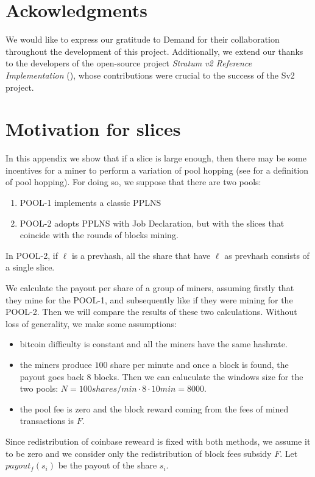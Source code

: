 \documentclass[11pt]{article}
\begin{document}
\section{Ackowledgments}
We would like to express our gratitude to Demand \cite{demand} for their collaboration throughout the development of this project. Additionally, we extend our thanks to the developers of the open-source project \emph{Stratum v2 Reference Implementation} (\cite{sv2}), whose contributions were crucial to the success of the Sv2 project.


\appendix
\section{Motivation for slices}
In this appendix we show that if a slice is large enough, then there may be some incentives for a miner to perform a variation of pool hopping (see \cite{rosenfeld} for a definition of pool hopping). For doing so, we suppose that there are two pools:
\begin{enumerate}
	\item POOL-1 implements a classic PPLNS
	\item POOL-2 adopts PPLNS with Job Declaration, but with the slices that coincide with the rounds of blocks mining. 
\end{enumerate}
In POOL-2, if $\ell$ is a prevhash, all the share that have $\ell$ as prevhash consists of a single slice.

We calculate the payout per share of a group of miners, assuming firstly that they mine for the POOL-1, and subsequently like if they were mining for the POOL-2. Then we will compare the results of these two calculations. Without loss of generality, we make some assumptions:
\begin{itemize}
	\item bitcoin difficulty is constant and all the miners have the same hashrate.
	\item the miners produce $100$ share per minute and once a block is found, the payout goes back $8$ blocks. Then we can caluculate the windows size for the two pools: $N = 100 shares/min \cdot 8 \cdot 10min = 8000$.
	\item the pool fee is zero and the block reward coming from the fees of mined transactions is $F$. 
	
\end{itemize}
Since redistribution of coinbase reweard is fixed with both methods, we assume it to be zero and we consider only the redistribution of block fees subsidy $F$.
Let $payout_f(s_i)$ be the payout of the share $s_i$.
\end{document}
